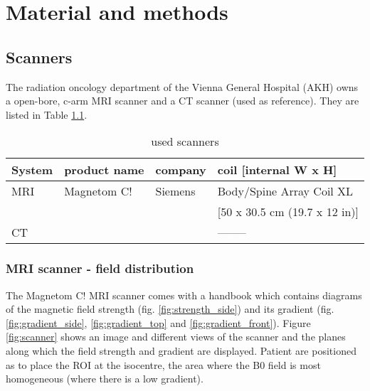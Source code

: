

\chapter{Material and methods}


\section{Scanners}

The radiation oncology department of the Vienna General Hospital (AKH) owns a open-bore, c-arm MRI scanner and a CT scanner (used as reference).
They are listed in Table \ref{tab:scanners}.

\begin{table}[h]
\centering
\begin{tabular}{llll}
System	& product name	& company	& coil [internal W x H]		\\
\toprule
MRI	& Magnetom C!	& Siemens	& Body/Spine Array Coil XL	\\
	&		&		& [50 x 30.5 cm (19.7 x 12 in)]	\\
CT	&		&		& --------
\end{tabular}
\caption{used scanners}
\label{tab:scanners}
\end{table}

\subsection{MRI scanner - field distribution}
\label{sec:magnetom}

The Magnetom C! MRI scanner comes with a handbook which contains diagrams of the magnetic field strength (fig. \ref{fig:strength_side}) and its gradient (fig. \ref{fig:gradient_side}, \ref{fig:gradient_top} and \ref{fig:gradient_front}).
Figure \ref{fig:scanner} shows an image and different views of the scanner and the planes along which the field strength and gradient are displayed.
Patient are positioned as to place the ROI at the isocentre, the area where the B0 field is most homogeneous (where there is a low gradient).


